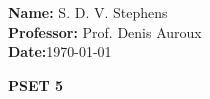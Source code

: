 \documentclass{report}
\begin{document}
\begin{titlebox}[Math 55a]
    \textbf{Name:} S. D. V. Stephens\\[2mm]
    \textbf{Professor:} Prof. Denis Auroux\\[2mm]
    \textbf{Date:}\today 
\tcblower
    \begin{center}
    \vspace{4mm}
    {\Huge\bfseries PSET 5}
    \end{center}
\end{titlebox}
\vspace{10mm}

\qs{}{}
\sol 

\qs{}{}
\sol 

\qs{}{}
\sol
\end{document}
